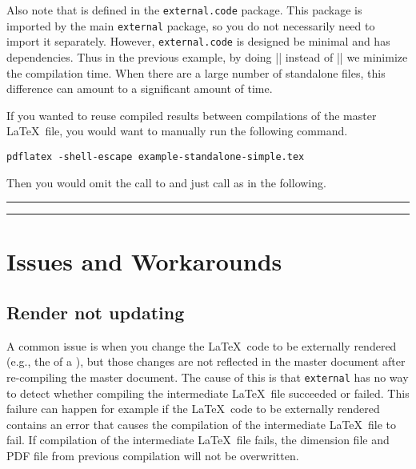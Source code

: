 \documentclass[10pt]{ltxdoc}
\newcommand{\pkg}[1]{\texttt{#1}}
\def\gauge{%
  \rule{0.2em}{7pt}%
  \llap{\rule[8pt]{0.2em}{2pt}}%
}
\begin{document}
Also note that  is defined in the \pkg{external.code}
package.
This package is imported by the main \pkg{external} package, so you do
not necessarily need to import it separately.
However, \pkg{external.code} is designed be minimal and has
dependencies.
Thus in the previous example, by doing |\RequirePackage{external.code}|
instead of |\RequirePackage{external}| we minimize the compilation
time.
When there are a large number of standalone files, this difference can
amount to a significant amount of time.

If you wanted to reuse compiled results between compilations of the
master \LaTeX\ file, you would want to manually run the following
command.

\begin{tcolorbox}
\begin{verbatim}
pdflatex -shell-escape example-standalone-simple.tex
\end{verbatim}
\end{tcolorbox}

Then you would omit the call to  and just call
 as in the following.

\begin{tcblisting}{}
\gauge\ExternalRead[file=example-standalone-simple]\gauge
\end{tcblisting}

\section{Issues and Workarounds}
\label{sec:Issues and Workarounds}

\subsection{Render not updating}
\label{subsec:Render not updating}

A common issue is when you change the \LaTeX\ code to be externally
rendered (e.g., the  of a ), but those changes
are not reflected in the master document after re-compiling the master
document.
The cause of this is that \pkg{external} has no way to detect whether
compiling the intermediate \LaTeX\ file succeeded or failed.
This failure can happen for example if the \LaTeX\ code to be
externally rendered contains an error that causes the compilation of
the intermediate \LaTeX\ file to fail.
If compilation of the intermediate \LaTeX\ file fails, the dimension
file and PDF file from previous compilation will not be overwritten.
\end{document}
